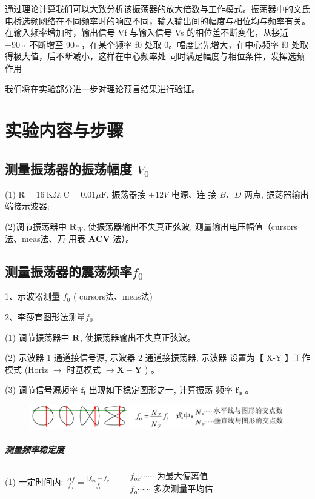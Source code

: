 \documentclass[a4paper,11pt,UTF8]{ctexart}
\begin{document}
通过理论计算我们可以大致分析该振荡器的放大倍数与工作模式。振荡器中的文氏电桥选频网络在不同频率时的响应不同，输入输出间的幅度与相位均与频率有关。
在输入频率增加时，输出信号 Vf 与输入信号 Vs 的相位差不断变化，从接近 −90◦ 不断增至 90◦，在某个频率 f0 处取 0。幅度比先增大，在中心频率 f0 处取得极大值，后不断减小，这样在中心频率处
同时满足幅度与相位条件，发挥选频作用

我们将在实验部分进一步对理论预言结果进行验证。




\section{实验内容与步骤}
\subsection{测量振荡器的振荡幅度 $V_{0}$}
(1) $\mathrm{R}=16 \mathrm{~K} \Omega, \mathrm{C}=0.01 \mu \mathrm{F}$, 振荡器接 $+12 V$ 电源、连 接 $B 、 D$ 两点, 振荡器输出端接示波器;


(2)调节振荡器中 $\boldsymbol{R}_{W}$, 使振荡器输出不失真正弦波, 测量输出电压幅值（cursors法、meas法、万 用表 $\mathbf{A C V}$ 法）。

\subsection{测量振荡器的震荡频率$f_0$}
1、示波器测量 $f_{0}$ ( cursors法、meas法)

2、李莎育图形法测量$f_{0}$

(1) 调节振荡器中 $\boldsymbol{R}_{\boldsymbol{}}$, 使振荡器输出不失真正弦波。


(2) 示波器 1 通道接信号源, 示波器 2 通道接振荡器, 示波器 设置为【 X-Y 】工作模式 (Horiz $\rightarrow$ 时基模式 $\rightarrow \mathbf{X}-\mathbf{Y}$ ) 。


(3) 调节信号源频率 $\boldsymbol{f}_{\boldsymbol{i}}$ 出现如下稳定图形之一, 计算振荡 频率 $\boldsymbol{f}_{\mathbf{0}}$ 。

\begin{figure}
	\centering
	\includegraphics[width = \textwidth]{李萨如正式.png}
\end{figure}


\subparagraph{测量频率稳定度}
(1) 一定时间内: $\frac{\Delta f}{f_{o}}=\frac{\left|f_{o x}-f_{o}\right|}{f_{o}} \quad \begin{aligned}&f_{o x} \cdots \cdots \text { 为最大偏离值 } \\&f_{o} \cdots \cdots \text { 多次测量平均估 }\end{aligned}$ 
\end{document}
